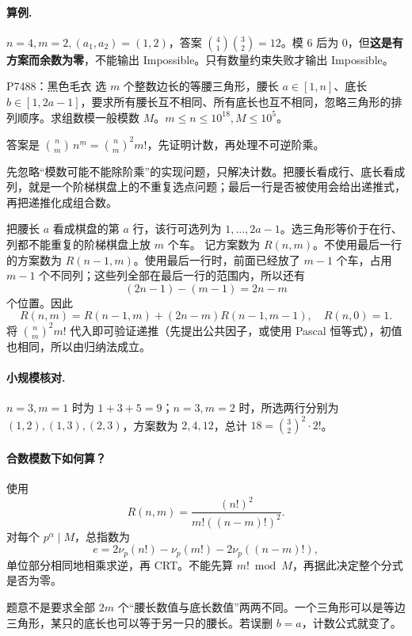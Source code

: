 \paragraph{算例.} $n=4,m=2,(a_1,a_2)=(1,2)$，答案 $\binom41\binom32=12$。模 $6$ 后为 $0$，但\textbf{这是有方案而余数为零}，不能输出 Impossible。只有数量约束失败才输出 Impossible。


\begin{problem}{P7488：黑色毛衣}
选 $m$ 个整数边长的等腰三角形，腰长 $a\in[1,n]$、底长 $b\in[1,2a-1]$，要求所有腰长互不相同、所有底长也互不相同，忽略三角形的排列顺序。求组数模一般模数 $M$。$m\le n\le10^{18},M\le10^5$。
\end{problem}
\hint 答案是 $\binom nm\,n^{\underline m}=\binom nm^2m!$，先证明计数，再处理不可逆阶乘。

\begin{pitfall}[讲解：先看这题到底在做什么]
先忽略“模数可能不能除阶乘”的实现问题，只解决计数。把腰长看成行、底长看成列，就是一个阶梯棋盘上的不重复选点问题；最后一行是否被使用会给出递推式，再把递推化成组合数。
\end{pitfall}

\sol 把腰长 $a$ 看成棋盘的第 $a$ 行，该行可选列为 $1,\ldots,2a-1$。选三角形等价于在行、列都不能重复的阶梯棋盘上放 $m$ 个车。
记方案数为 $R(n,m)$。不使用最后一行的方案数为 $R(n-1,m)$。使用最后一行时，前面已经放了 $m-1$ 个车，占用 $m-1$ 个不同列；这些列全部在最后一行的范围内，所以还有
\[
 (2n-1)-(m-1)=2n-m
\]
个位置。因此
\[
 R(n,m)=R(n-1,m)+(2n-m)R(n-1,m-1),\quad R(n,0)=1.
\]
将 $\binom nm^2m!$ 代入即可验证递推（先提出公共因子，或使用 Pascal 恒等式），初值也相同，所以由归纳法成立。

\paragraph{小规模核对.} $n=3,m=1$ 时为 $1+3+5=9$；$n=3,m=2$ 时，所选两行分别为 $(1,2),(1,3),(2,3)$，方案数为 $2,4,12$，总计 $18=\binom32^2\cdot2!$。

\paragraph{合数模数下如何算？}
使用
\[
 R(n,m)=\frac{(n!)^2}{m!((n-m)!)^2}.
\]
对每个 $p^\alpha\mid M$，总指数为
\[
 e=2\nu_p(n!)-\nu_p(m!)-2\nu_p((n-m)!),
\]
单位部分相同地相乘求逆，再 CRT。不能先算 $m!\bmod M$，再据此决定整个分式是否为零。
\begin{pitfall}
题意不是要求全部 $2m$ 个“腰长数值与底长数值”两两不同。一个三角形可以是等边三角形，某只的底长也可以等于另一只的腰长。若误删 $b=a$，计数公式就变了。
\end{pitfall}

